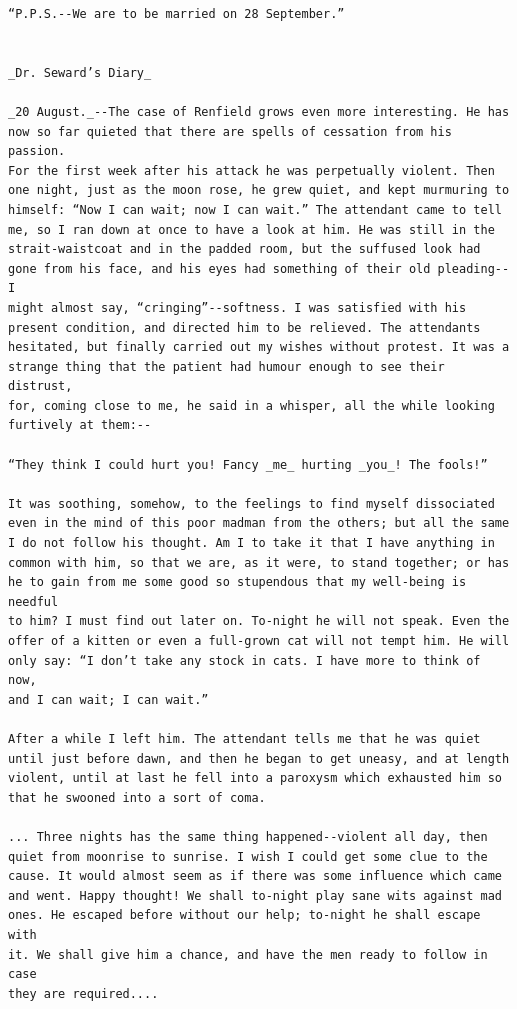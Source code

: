 \documentclass{article}
\begin{document}
\begin{verbatim}
“P.P.S.--We are to be married on 28 September.”


_Dr. Seward’s Diary_

_20 August._--The case of Renfield grows even more interesting. He has
now so far quieted that there are spells of cessation from his passion.
For the first week after his attack he was perpetually violent. Then
one night, just as the moon rose, he grew quiet, and kept murmuring to
himself: “Now I can wait; now I can wait.” The attendant came to tell
me, so I ran down at once to have a look at him. He was still in the
strait-waistcoat and in the padded room, but the suffused look had
gone from his face, and his eyes had something of their old pleading--I
might almost say, “cringing”--softness. I was satisfied with his
present condition, and directed him to be relieved. The attendants
hesitated, but finally carried out my wishes without protest. It was a
strange thing that the patient had humour enough to see their distrust,
for, coming close to me, he said in a whisper, all the while looking
furtively at them:--

“They think I could hurt you! Fancy _me_ hurting _you_! The fools!”

It was soothing, somehow, to the feelings to find myself dissociated
even in the mind of this poor madman from the others; but all the same
I do not follow his thought. Am I to take it that I have anything in
common with him, so that we are, as it were, to stand together; or has
he to gain from me some good so stupendous that my well-being is needful
to him? I must find out later on. To-night he will not speak. Even the
offer of a kitten or even a full-grown cat will not tempt him. He will
only say: “I don’t take any stock in cats. I have more to think of now,
and I can wait; I can wait.”

After a while I left him. The attendant tells me that he was quiet
until just before dawn, and then he began to get uneasy, and at length
violent, until at last he fell into a paroxysm which exhausted him so
that he swooned into a sort of coma.

... Three nights has the same thing happened--violent all day, then
quiet from moonrise to sunrise. I wish I could get some clue to the
cause. It would almost seem as if there was some influence which came
and went. Happy thought! We shall to-night play sane wits against mad
ones. He escaped before without our help; to-night he shall escape with
it. We shall give him a chance, and have the men ready to follow in case
they are required....


\end{verbatim}
\end{document}

